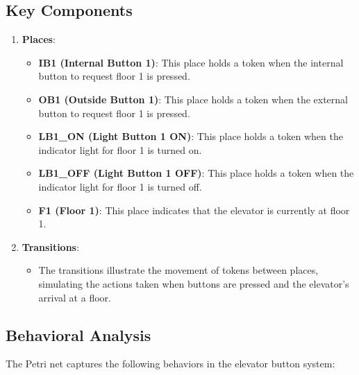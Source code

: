 \documentclass[12pt	]{article}
\begin{document}
\subsection{Key Components}

\begin{enumerate}
	\item \textbf{Places}:
	\begin{itemize}
		\item \textbf{IB1 (Internal Button 1)}: This place holds a token when the internal button to request floor 1 is pressed.
		\item \textbf{OB1 (Outside Button 1)}: This place holds a token when the external button to request floor 1 is pressed.
		\item \textbf{LB1\_ON (Light Button 1 ON)}: This place holds a token when the indicator light for floor 1 is turned on.
		\item \textbf{LB1\_OFF (Light Button 1 OFF)}: This place holds a token when the indicator light for floor 1 is turned off.
		\item \textbf{F1 (Floor 1)}: This place indicates that the elevator is currently at floor 1.
	\end{itemize}
	\item \textbf{Transitions}:
	\begin{itemize}
		\item The transitions illustrate the movement of tokens between places, simulating the actions taken when buttons are pressed and the elevator's arrival at a floor.
	\end{itemize}
\end{enumerate}

\subsection{Behavioral Analysis}

The Petri net captures the following behaviors in the elevator button system:
\end{document}
